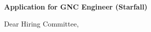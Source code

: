 \documentclass[10pt,a4paper]{article}
\newcommand{\SubjectSize}{10pt}
\newcommand{\BodySize}{9.25pt}
\newcommand{\SubjectLineSize}{11.5pt}
\newcommand{\BodyLineSize}{12.1pt}
\newcommand{\RecipientAfter}{8pt}         %
\newcommand{\SubjectAfter}{42pt}          %
\newcommand{\SalutationAfter}{18pt}       %
\begin{document}
\vspace{\RecipientAfter}

{\fontsize{\SubjectSize}{\SubjectLineSize}\selectfont
    \textbf{\textcolor{CVBlack}{Application for GNC Engineer (Starfall)}}}

\vspace{\SubjectAfter}

{\fontsize{\BodySize}{\BodyLineSize}\selectfont
    \textcolor{CVDarkGray}{Dear Hiring Committee,}}


\vspace{\SalutationAfter}

\end{document}

